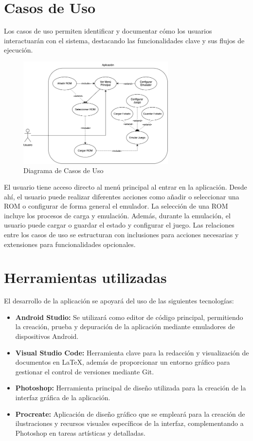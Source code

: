\section{Casos de Uso}

Los casos de uso permiten identificar y documentar cómo los usuarios interactuarán con el sistema, destacando las funcionalidades clave y sus flujos de ejecución.

\begin{figure}[H]
    \centering
    \includegraphics[width=0.7\textwidth]{include/images/casosuso.png}
    \caption{Diagrama de Casos de Uso}
    \label{figure:usecases}
\end{figure}

El usuario tiene acceso directo al menú principal al entrar en la aplicación. Desde ahí, el usuario puede realizar diferentes acciones como añadir o seleccionar una ROM o configurar de forma general el emulador. La selección de una ROM incluye los procesos de carga y emulación. Además, durante la emulación, el usuario puede cargar o guardar el estado y configurar el juego. Las relaciones entre los casos de uso se estructuran con inclusiones para acciones necesarias y extensiones para funcionalidades opcionales.

\section{Herramientas utilizadas}

El desarrollo de la aplicación se apoyará del uso de las siguientes tecnologías:

\begin{itemize}
    \item \textbf{Android Studio:} Se utilizará como editor de código principal, permitiendo la creación, prueba y depuración de la aplicación mediante emuladores de dispositivos Android.
    \item \textbf{Visual Studio Code:} Herramienta clave para la redacción y visualización de documentos en LaTeX, además de proporcionar un entorno gráfico para gestionar el control de versiones mediante Git.
    \item \textbf{Photoshop:} Herramienta principal de diseño utilizada para la creación de la interfaz gráfica de la aplicación.
    \item \textbf{Procreate:} Aplicación de diseño gráfico que se empleará para la creación de ilustraciones y recursos visuales específicos de la interfaz, complementando a Photoshop en tareas artísticas y detalladas.
\end{itemize}

